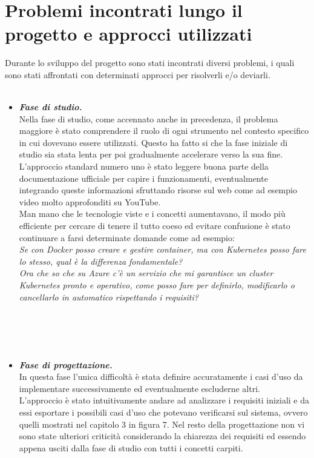 \documentclass[a4paper,12pt]{report}
\begin{document}
\section{Problemi incontrati lungo il progetto e approcci utilizzati}
Durante lo sviluppo del progetto sono stati incontrati diversi problemi, i quali sono stati affrontati con determinati approcci per risolverli e/o deviarli.\\ \\
\begin{itemize}
\item \textit{\textbf{Fase di studio.}}\\
Nella fase di studio, come accennato anche in precedenza, il problema maggiore è stato comprendere il ruolo di ogni strumento nel contesto specifico in cui dovevano essere utilizzati. Questo ha fatto si che la fase iniziale di studio sia stata lenta per poi gradualmente accelerare verso la sua fine.\\
L'approccio standard numero uno è stato leggere buona parte della documentazione ufficiale per capire i funzionamenti, eventualmente integrando queste informazioni sfruttando risorse sul web come ad esempio video molto approfonditi su YouTube.\cite{youtubek8s}\\
Man mano che le tecnologie viste e i concetti aumentavano, il modo più efficiente per cercare di tenere il tutto coeso ed evitare confusione è stato continuare a farsi determinate domande come ad esempio: \\ \textit{Se con Docker posso creare e gestire container, ma con Kubernetes posso fare lo stesso, qual è la differenza fondamentale?} \\ \textit{Ora che so che su Azure c'è un servizio che mi garantisce un cluster Kubernetes pronto e operativo, come posso fare per definirlo, modificarlo o cancellarlo in automatico rispettando i requisiti?} \\ \\ \\ \\ \\
\item \textit{\textbf{Fase di progettazione.}}\\
In questa fase l'unica difficoltà è stata definire accuratamente i casi d'uso da implementare successivamente ed eventualmente escluderne altri.\\
L'approccio è stato intuitivamente andare ad analizzare i requisiti iniziali e da essi esportare i possibili casi d'uso che potevano verificarsi sul sistema, ovvero quelli mostrati nel capitolo 3 in figura 7. Nel resto della progettazione non vi sono state ulteriori criticità considerando la chiarezza dei requisiti ed essendo appena usciti dalla fase di studio con tutti i concetti carpiti.\\

\end{itemize}
\end{document}
